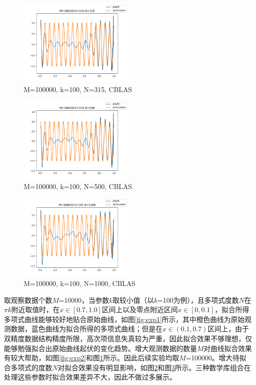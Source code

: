 \documentclass[a4paper]{article}
\begin{document}
\begin{figure}[tbp]
  \centering
  \includegraphics[width=0.5\textwidth]{figures/lapack/figure2_M_100000_k_100_N_315.png}
  \caption{M=100000, k=100, N=315, CBLAS}
  \label{fig:exp3}
\end{figure}

\begin{figure}[tbp]
  \centering
  \includegraphics[width=0.5\textwidth]{figures/lapack/figure5_M_100000_k_100_N_500.png}
  \caption{M=100000, k=100, N=500, CBLAS}
  \label{fig:exp4}
\end{figure}

\begin{figure}[tbp]
  \centering
  \includegraphics[width=0.5\textwidth]{figures/atlas/figure8_M_100000_k_100_N_1000.png}
  \caption{M=100000, k=100, N=1000, CBLAS}
  \label{fig:exp5}
\end{figure}



取观察数据个数$M$=10000，当参数$k$取较小值（以$k$=100为例），且多项式度数$N$在$\pi k$附近取值时，在$x \in [0.7, 1.0]$区间上以及零点附近区间$x \in [0, 0.1]$，拟合所得多项式曲线能够较好地贴合原始曲线，如图\ref{fig:exp1}所示，其中橙色曲线为原始观测数据，蓝色曲线为拟合所得的多项式曲线；但是在$x \in (0.1, 0.7)$区间上，由于双精度数据结构精度所限，高次项信息失真较为严重，因此拟合效果不够理想，仅能够勉强拟合出原始曲线起伏的变化趋势。增大观测数据的数量$M$对曲线拟合效果有较大帮助，如图\ref{fig:exp2}和图\ref{fig:exp3}所示。因此后续实验均取$M$=100000。增大待拟合多项式的度数$N$对拟合效果没有明显影响，如图\ref{fig:exp4}和图\ref{fig:exp5}所示。三种数学库组合在处理这些参数时拟合效果差异不大，因此不做过多展示。
\end{document}

